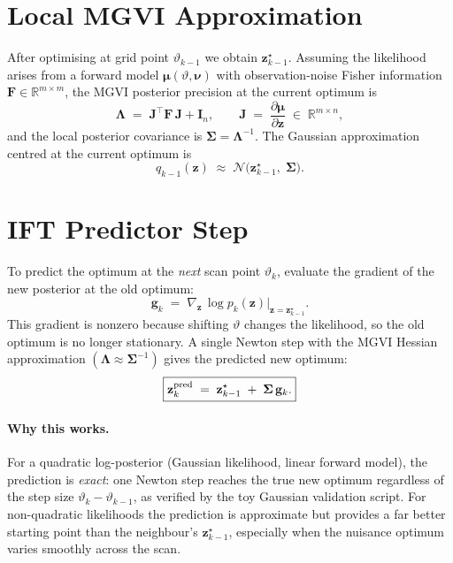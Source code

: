 \documentclass[11pt, a4paper]{article}
\newcommand{\nupar}{\bm{\nu}}
\newcommand{\zz}{\mathbf{z}}
\newcommand{\Sig}{\boldsymbol{\Sigma}}
\newcommand{\Lam}{\boldsymbol{\Lambda}}
\begin{document}
\section{Local MGVI Approximation}

After optimising at grid point $\vartheta_{k-1}$ we obtain $\zz^\star_{k-1}$.
Assuming the likelihood arises from a forward model
$\bm{\mu}(\vartheta,\nupar)$ with observation-noise Fisher information
$\mathbf{F}\in\mathbb{R}^{m\times m}$, the MGVI posterior precision
at the current optimum is
\begin{equation}
  \Lam \;=\; \mathbf{J}^\top \mathbf{F}\, \mathbf{J} + \mathbf{I}_n,
  \qquad
  \mathbf{J} \;=\; \frac{\partial \bm{\mu}}{\partial \zz}
               \;\in\;\mathbb{R}^{m\times n},
\end{equation}
and the local posterior covariance is $\Sig = \Lam^{-1}$.  The Gaussian
approximation centred at the current optimum is
\begin{equation}
  q_{k-1}(\zz) \;\approx\; \mathcal{N}\!\bigl(\zz^\star_{k-1},\;\Sig\bigr).
\end{equation}

\section{IFT Predictor Step}

To predict the optimum at the \emph{next} scan point $\vartheta_k$, evaluate the
gradient of the new posterior at the old optimum:
\begin{equation}
  \mathbf{g}_k
  \;=\; \nabla_{\zz}\,\log p_k(\zz)\Big|_{\zz = \zz^\star_{k-1}}.
\end{equation}
This gradient is nonzero because shifting $\vartheta$ changes the likelihood, so
the old optimum is no longer stationary.  A single Newton step with the MGVI
Hessian approximation $(\Lam \approx \Sig^{-1})$ gives the predicted new optimum:
\begin{equation}
  \boxed{
    \zz^{\rm pred}_k
    \;=\; \zz^\star_{k-1}
          \;+\; \Sig\,\mathbf{g}_k.
  }
\end{equation}

\paragraph{Why this works.}
For a quadratic log-posterior (Gaussian likelihood, linear forward model), the
prediction is \emph{exact}: one Newton step reaches the true new optimum
regardless of the step size $\vartheta_k - \vartheta_{k-1}$, as verified by the
toy Gaussian validation script.  For non-quadratic likelihoods the prediction is
approximate but provides a far better starting point than the neighbour's
$\zz^\star_{k-1}$, especially when the nuisance optimum varies smoothly across
the scan.
\end{document}
